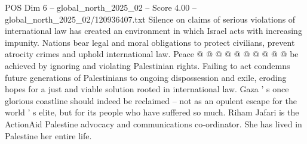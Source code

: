 \begin{textsample}{POS Dim 6 – global\_north\_2025\_02 – Score 4.00 – global\_north\_2025\_02/120936407.txt}
Silence on claims of serious violations of international law has created an environment in which Israel acts with increasing impunity.
Nations bear legal and moral obligations to protect civilians, prevent atrocity crimes and uphold international law.
Peace @ @ @ @ @ @ @ @ @ @ be achieved by ignoring and violating Palestinian rights.
Failing to act condemns future generations of Palestinians to ongoing dispossession and exile, eroding hopes for a just and viable solution rooted in international law.
Gaza ' s once glorious coastline should indeed be reclaimed -- not as an opulent escape for the world ' s elite, but for its people who have suffered so much.
Riham Jafari is the ActionAid Palestine advocacy and communications co-ordinator.
She has lived in Palestine her entire life.

\end{textsample}
